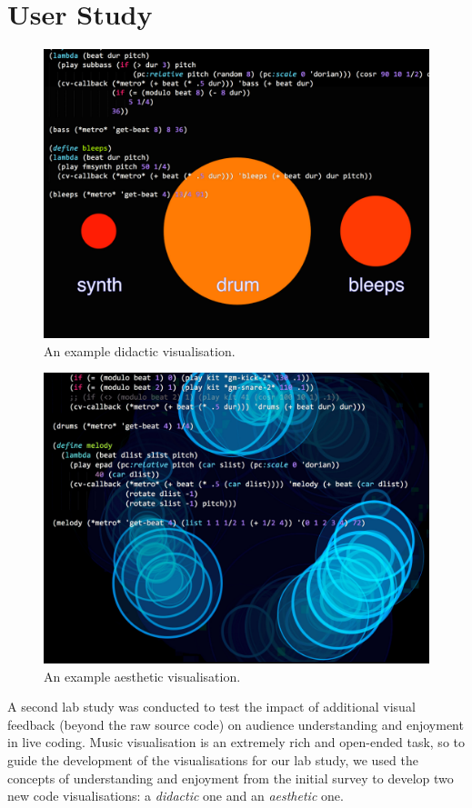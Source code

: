 
\chapter{User Study}



\begin{figure}
\centering
\includegraphics[width=0.75\columnwidth]{../study-2/results/visualisations/didactic-vis-overlay}
\caption{An example didactic visualisation.}
\label{fig:didactic-visualisation}
\end{figure}

\begin{figure}
\centering
\includegraphics[width=0.75\columnwidth]{../study-2/results/visualisations/aesthetic-vis-overlay}
\caption{An example aesthetic visualisation.}
\label{fig:aesthetic-visualisation}
\end{figure}

A second lab study was conducted to test the impact of additional
visual feedback (beyond the raw source code) on audience understanding
and enjoyment in live coding. Music visualisation is an extremely rich
and open-ended task, so to guide the development of the visualisations
for our lab study, we used the concepts of understanding and enjoyment
from the initial survey to develop two new code visualisations: a
\emph{didactic} one and an \emph{aesthetic} one.

